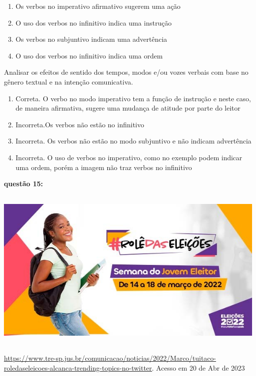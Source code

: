 {\begin{enumerate}
\def\labelenumi{\alph{enumi})}
\item
  Os verbos no imperativo afirmativo sugerem uma ação
\item
  O uso dos verbos no infinitivo indica uma instrução
\item
  Os verbos no subjuntivo indicam uma advertência
\item
  O uso dos verbos no infinitivo indica uma ordem
\end{enumerate}

Analisar os efeitos de sentido dos tempos, modos e/ou vozes verbais com
base no gênero textual e na intenção comunicativa.

\begin{enumerate}
\def\labelenumi{\arabic{enumi}.}
\item
  Correta. O verbo no modo imperativo tem a função de instrução e neste
  caso, de maneira afirmativa, sugere uma mudança de atitude por parte
  do leitor
\item
  Incorreta.Os verbos não estão no infinitivo
\item
  Incorreta. Os verbos não estão no modo subjuntivo e não indicam
  advertência
\item
  Incorreta. O uso de verbos no imperativo, como no exemplo podem
  indicar uma ordem, porém a imagem não traz verbos no infinitivo
\end{enumerate}

\textbf{questão 15:}

\includegraphics[width=5.90551in,height=3.15278in]{./imgSAEB_7_POR/media/image20.png}

\href{https://www.tre-sp.jus.br/comunicacao/noticias/2022/Marco/tuitaco-roledaseleicoes-alcanca-trending-topics-no-twitter}{\uline{https://www.tre-sp.jus.br/comunicacao/noticias/2022/Marco/tuitaco-roledaseleicoes-alcanca-trending-topics-no-twitter}}.
Acesso em 20 de Abr de 2023

}
